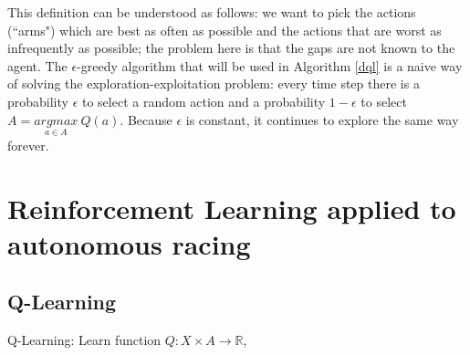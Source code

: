 This definition can be understood as follows: we want to pick the actions (``arms") which are best as often as possible and the actions that are worst as infrequently as possible; the problem here is that the gaps are not known to the agent. \newline
The $\epsilon$-greedy algorithm that will be used in Algorithm \ref{dql} is a naive way of solving the exploration-exploitation problem: every time step there is a probability $\epsilon$ to select a random action and a probability $1-\epsilon$ to select $A = \underset{a \in A}{argmax} \: Q(a)$. Because $\epsilon$ is constant, it continues to explore the same way forever.


\section{Reinforcement Learning applied to autonomous racing}
\label{rlaracing}
\subsection{Q-Learning}
\label{qlearningsection}
\begin{algorithm}
\caption{Q-Learning: Learn function $Q: X \times A \rightarrow \mathbb{R}$, \cite{watkins1989}}
\label{qlearning}
\end{algorithm}


